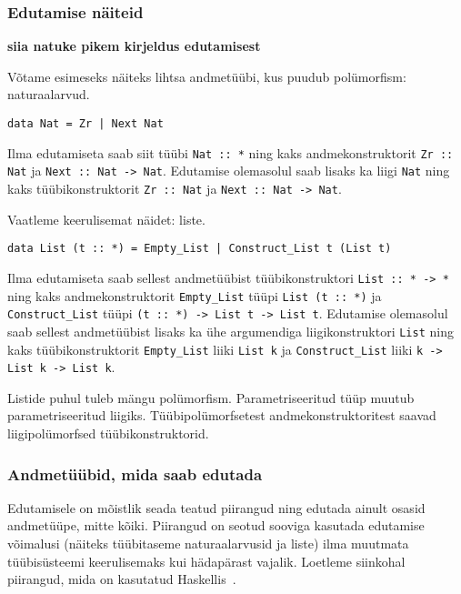 \documentclass[12pt]{article}
\newcommand\markus[1]{\textcolor{roheline}{\textbf{#1}}}
\begin{document}
      \subsubsection{Edutamise näiteid}
        \markus{siia natuke pikem kirjeldus edutamisest}

        Võtame esimeseks näiteks lihtsa andmetüübi, kus puudub polümorfism: naturaalarvud.

        \begin{verbatim}data Nat = Zr | Next Nat\end{verbatim}

        Ilma edutamiseta saab siit tüübi \verb!Nat :: *! ning kaks andmekonstruktorit \verb!Zr :: Nat! ja \verb!Next :: Nat -> Nat!. Edutamise olemasolul saab lisaks ka liigi \verb!Nat! ning kaks tüübikonstruktorit \verb!Zr :: Nat! ja \verb!Next :: Nat -> Nat!.

        Vaatleme keerulisemat näidet: liste.

        \begin{verbatim}data List (t :: *) = Empty_List | Construct_List t (List t)\end{verbatim}

        Ilma edutamiseta saab sellest andmetüübist tüübikonstruktori \verb!List :: * -> *! ning kaks andmekonstruktorit \verb!Empty_List! tüüpi \verb!List (t :: *)! ja \verb!Construct_List! tüüpi \verb!(t :: *) -> List t -> List t!. Edutamise olemasolul saab sellest andmetüübist lisaks ka ühe argumendiga liigikonstruktori \verb!List! ning kaks tüübikonstruktorit \verb!Empty_List! liiki \verb!List k! ja \verb!Construct_List! liiki \verb!k -> List k -> List k!.

        Listide puhul tuleb mängu polümorfism. Parametriseeritud tüüp muutub parametriseeritud liigiks. Tüübipolümorfsetest andmekonstruktoritest saavad liigipolümorfsed tüübikonstruktorid.
      \subsubsection{Andmetüübid, mida saab edutada}\label{kitsendused}
        Edutamisele on mõistlik seada teatud piirangud ning edutada ainult osasid andmetüüpe, mitte kõiki. Piirangud on seotud sooviga kasutada edutamise võimalusi (näiteks tüübitaseme naturaalarvusid ja liste) ilma muutmata tüübisüsteemi keerulisemaks kui hädapärast vajalik. Loetleme siinkohal piirangud, mida on kasutatud Haskellis~\cite{Giv}.
\end{document}
